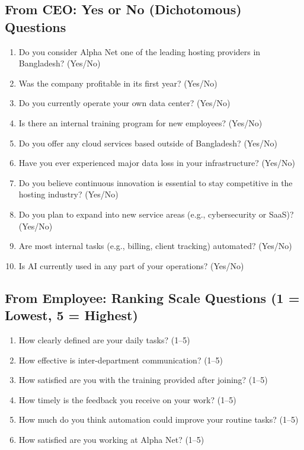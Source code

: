 \subsection*{From CEO: Yes or No (Dichotomous) Questions}
\begin{enumerate}
    \item Do you consider Alpha Net one of the leading hosting providers in Bangladesh? (Yes/No)
    \item Was the company profitable in its first year? (Yes/No)
    \item Do you currently operate your own data center? (Yes/No)
    \item Is there an internal training program for new employees? (Yes/No)
    \item Do you offer any cloud services based outside of Bangladesh? (Yes/No)
    \item Have you ever experienced major data loss in your infrastructure? (Yes/No)
    \item Do you believe continuous innovation is essential to stay competitive in the hosting industry? (Yes/No)
    \item Do you plan to expand into new service areas (e.g., cybersecurity or SaaS)? (Yes/No)
    \item Are most internal tasks (e.g., billing, client tracking) automated? (Yes/No)
    \item Is AI currently used in any part of your operations? (Yes/No)
\end{enumerate}

\subsection*{From Employee: Ranking Scale Questions (1 = Lowest, 5 = Highest)}
\begin{enumerate}
    \item How clearly defined are your daily tasks? (1--5)
    \item How effective is inter-department communication? (1--5)
    \item How satisfied are you with the training provided after joining? (1--5)
    \item How timely is the feedback you receive on your work? (1--5)
    \item How much do you think automation could improve your routine tasks? (1--5)
    \item How satisfied are you working at Alpha Net? (1--5)
\end{enumerate}

